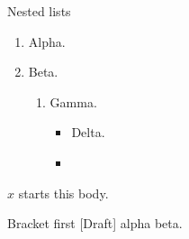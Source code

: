 \documentclass{beamer}
\begin{document}
\begin{frame}{Nested lists}
\begin{enumerate}
  \item Alpha.

  \item Beta.
  \begin{enumerate}
    \item Gamma.
    \begin{itemize}
      \item Delta.
      \item
    \end{itemize}
  \end{enumerate}
\end{enumerate}
\end{frame}

\begin{frame}
$x$ starts this body.
\end{frame}

\begin{frame}{Bracket first}
[Draft] alpha beta.
\end{frame}
\end{document}
